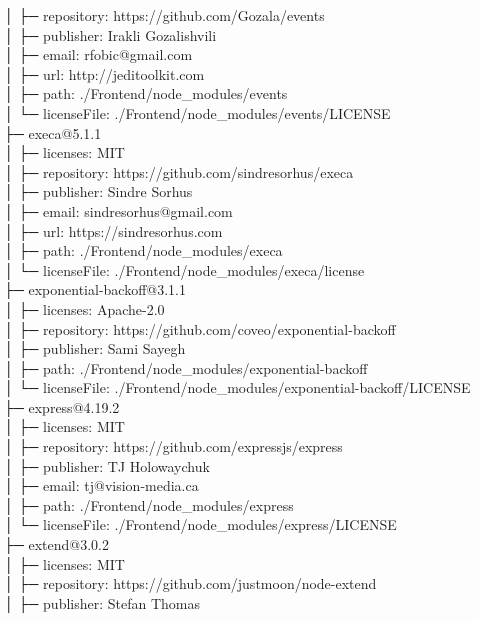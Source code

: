 \documentclass[
    paper=a4,
    twoside=false,
    parskip=half,
    listof=entryprefix,
    listof=totoc,
    index=totoc,
    bibliography=totoc,
    headsepline,
]{scrbook}
\begin{document}
    │  ├─ repository: https://github.com/Gozala/events\\
    │  ├─ publisher: Irakli Gozalishvili\\
    │  ├─ email: rfobic@gmail.com\\
    │  ├─ url: http://jeditoolkit.com\\
    │  ├─ path: ./Frontend/node\_modules/events\\
    │  └─ licenseFile: ./Frontend/node\_modules/events/LICENSE\\
    ├─ execa@5.1.1\\
    │  ├─ licenses: MIT\\
    │  ├─ repository: https://github.com/sindresorhus/execa\\
    │  ├─ publisher: Sindre Sorhus\\
    │  ├─ email: sindresorhus@gmail.com\\
    │  ├─ url: https://sindresorhus.com\\
    │  ├─ path: ./Frontend/node\_modules/execa\\
    │  └─ licenseFile: ./Frontend/node\_modules/execa/license\\
    ├─ exponential-backoff@3.1.1\\
    │  ├─ licenses: Apache-2.0\\
    │  ├─ repository: https://github.com/coveo/exponential-backoff\\
    │  ├─ publisher: Sami Sayegh\\
    │  ├─ path: ./Frontend/node\_modules/exponential-backoff\\
    │  └─ licenseFile: ./Frontend/node\_modules/exponential-backoff/LICENSE\\
    ├─ express@4.19.2\\
    │  ├─ licenses: MIT\\
    │  ├─ repository: https://github.com/expressjs/express\\
    │  ├─ publisher: TJ Holowaychuk\\
    │  ├─ email: tj@vision-media.ca\\
    │  ├─ path: ./Frontend/node\_modules/express\\
    │  └─ licenseFile: ./Frontend/node\_modules/express/LICENSE\\
    ├─ extend@3.0.2\\
    │  ├─ licenses: MIT\\
    │  ├─ repository: https://github.com/justmoon/node-extend\\
    │  ├─ publisher: Stefan Thomas\\
\end{document}
